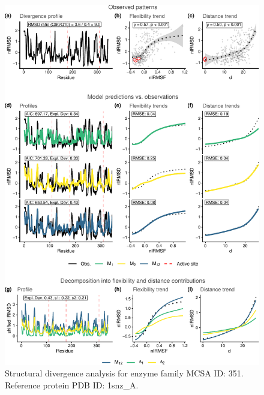 \documentclass[
]{article}
\begin{document}
\clearpage
\begin{figure}[H]
\centering


\begin{center}\includegraphics{supplementary_material_files/figure-latex/generate_figures-17} \end{center}

\caption{Structural divergence analysis for enzyme family MCSA ID: 351. Reference protein PDB ID: 1snz\_A.}
\end{figure}
\end{document}
